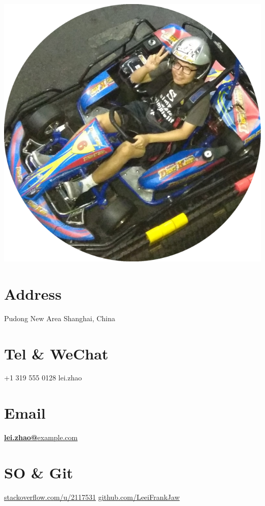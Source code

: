 \documentclass[a4paper]{friggeri-cv}
\begin{document}


\begin{aside}
  \includegraphics[scale=0.18]{img/zhao_circle.png}
  \section{Address}
  Pudong New Area
  Shanghai, China
  ~
  \section{Tel \& WeChat}
  +1 319 555 0128
  lei.zhao
  ~
  \section{Email}
  \href{mailto:lei.zhao@example.com}{\textbf{lei.zhao@}example.com}
  ~
  \section{SO \& Git}
  \href{https://stackoverflow.com/users/2117531/lei-zhao}{stackoverflow.com/u/2117531}
  \href{https://github.com/LeeiFrankJaw}{github.com/LeeiFrankJaw}
  ~

\end{aside}
\end{document}
